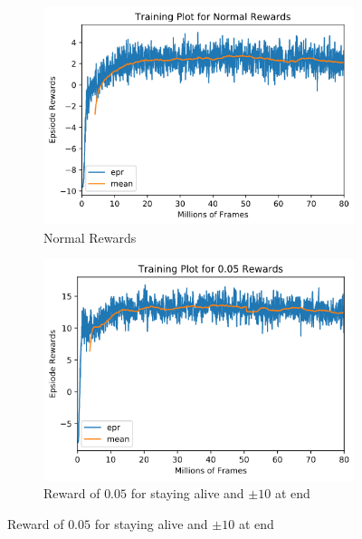 \begin{figure}[ht!]
    \centering
    \begin{subfigure}{0.49\textwidth}
        \centering
        \includegraphics[width=\textwidth]{figures/a3c-training-normal.png}
        \caption{Normal Rewards}
        \label{fig:training-a3c-normal}
    \end{subfigure}
    \begin{subfigure}{0.49\textwidth}
        \centering
        \includegraphics[width=\textwidth]{figures/a3c-training-0-05.png}
        \caption{Reward of $0.05$ for staying alive and $\pm 10$ at end}
        \label{fig:training-a3c-05}
    \end{subfigure}
    

\end{figure}
